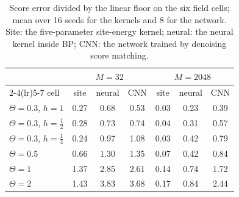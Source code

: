 \begin{table}[h]
\centering\small
\caption{Score error divided by the linear floor on the six field cells; mean over 16 seeds for the kernels and 8 for the network. Site: the five-parameter site-energy kernel; neural: the neural kernel inside BP; CNN: the network trained by denoising score matching.}
\label{tab:field}
\begin{tabular}{lcccccc}
\toprule
 & \multicolumn{3}{c}{$M=32$} & \multicolumn{3}{c}{$M=2048$} \\
\cmidrule(lr){2-4}\cmidrule(lr){5-7}
cell & site & neural & CNN & site & neural & CNN \\
\midrule
$\Theta=0.3$, $h=1$ & 0.27 & 0.68 & 0.53 & 0.03 & 0.23 & 0.39 \\
$\Theta=0.3$, $h=\tfrac12$ & 0.28 & 0.73 & 0.74 & 0.04 & 0.31 & 0.57 \\
$\Theta=0.3$, $h=\tfrac14$ & 0.24 & 0.97 & 1.08 & 0.03 & 0.42 & 0.79 \\
$\Theta=0.5$ & 0.66 & 1.30 & 1.35 & 0.07 & 0.42 & 0.84 \\
$\Theta=1$ & 1.37 & 2.85 & 2.61 & 0.14 & 0.74 & 1.72 \\
$\Theta=2$ & 1.43 & 3.83 & 3.68 & 0.17 & 0.84 & 2.44 \\
\bottomrule
\end{tabular}
\end{table}
